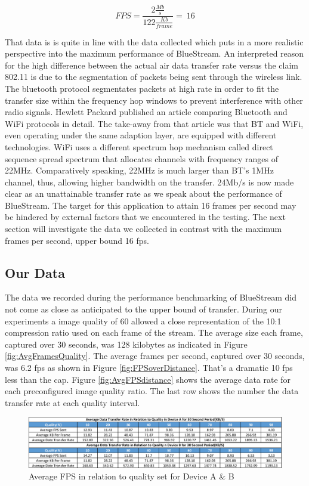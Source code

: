 \documentclass[a4paper,12pt]{article}
\begin{document}
$$FPS = \frac{2\frac{Mb}{s}}{122\frac{Kb}{frame}} = ~ 16 $$

That data is is quite in line with the data collected which puts in a more realistic perspective into the maximum performance of BlueStream. An interpreted reason for the high difference between the actual air data transfer rate versus the claim 802.11 is due to the segmentation of packets being sent through the wireless link. The bluetooth protocol segmentates packets at high rate in order to fit the transfer size within the frequency hop windows to prevent interference with other radio signals. Hewlett Packard published an article comparing Bluetooth and WiFi protocols in detail\cite{HPPaper}. The take-away from that article was that BT and WiFi, even operating under the same adaption layer, are equipped with different technologies. WiFi uses a different spectrum hop mechanism called direct sequence spread spectrum that allocates channels with frequency ranges of 22MHz. Comparatively speaking, 22MHz is much larger than BT’s 1MHz channel, thus, allowing higher bandwidth on the transfer. 24Mb/s is now made clear as an unattainable transfer rate as we speak about the performance of BlueStream. The target for this application to attain 16 frames per second may be hindered by external factors that we encountered in the testing. The next section will investigate the data we collected in contrast with the maximum frames per second, upper bound 16 fps. 

\subsection{Our Data}

The data we recorded during the performance benchmarking of BlueStream did not come as close as anticipated to the upper bound of transfer. During our experiments a image quality of 60 allowed a close representation of the 10:1 compression ratio used on each frame of the stream. The average size each frame, captured over 30 seconds, was 128 kilobytes as indicated in Figure \ref{fig:AvgFramesQuality}. The average frames per second, captured over 30 seconds, was 6.2 fps as shown in Figure \ref{fig:FPSoverDistance}. That’s a dramatic 10 fps less than the cap. Figure \ref{fig:AvgFPSdistance} shows the average data rate for each preconfigured image quality ratio. The last row shows the number the data transfer rate at each quality interval.

\begin{figure}[h!]
\centering
\includegraphics[scale=.7]{Figures/Figure13.png}
\caption{Average FPS in relation to quality set for Device A \& B}
\label{fig:ScalingDimension}
\end{figure}
\end{document}
